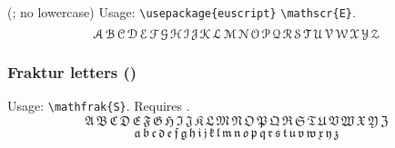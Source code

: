 \begingroup
\noindent
(; no lowercase) Usage: \verb'\usepackage{euscript}' \verb'\mathscr{E}'.
\renewcommand{\mathscr}{\EuScript}
\[
\mathscr{A}\,\mathscr{B}\,\mathscr{C}\,\mathscr{D}\,\mathscr{E}
\,\mathscr{F}\,\mathscr{G}\,\mathscr{H}\,\mathscr{I}\,\mathscr{J}
\,\mathscr{K}\,\mathscr{L}\,\mathscr{M}\,\mathscr{N}\,\mathscr{O}
\,\mathscr{P}\,\mathscr{Q}\,\mathscr{R}\,\mathscr{S}\,\mathscr{T}
\,\mathscr{U}\,\mathscr{V}\,\mathscr{W}\,\mathscr{X}\,\mathscr{Y}
\,\mathscr{Z}
\]
\endgroup

\subsubsection{Fraktur letters ()}
Usage: \verb'\mathfrak{S}'.  Requires .
\[
\mathfrak{A}\,\mathfrak{B}\,\mathfrak{C}\,\mathfrak{D}\,\mathfrak{E}
\,\mathfrak{F}\,\mathfrak{G}\,\mathfrak{H}\,\mathfrak{I}\,\mathfrak{J}
\,\mathfrak{K}\,\mathfrak{L}\,\mathfrak{M}\,\mathfrak{N}\,\mathfrak{O}
\,\mathfrak{P}\,\mathfrak{Q}\,\mathfrak{R}\,\mathfrak{S}\,\mathfrak{T}
\,\mathfrak{U}\,\mathfrak{V}\,\mathfrak{W}\,\mathfrak{X}\,\mathfrak{Y}
\,\mathfrak{Z}
\]
\[
\mathfrak{a}\,\mathfrak{b}\,\mathfrak{c}\,\mathfrak{d}\,\mathfrak{e}
\,\mathfrak{f}\,\mathfrak{g}\,\mathfrak{h}\,\mathfrak{i}\,\mathfrak{j}
\,\mathfrak{k}\,\mathfrak{l}\,\mathfrak{m}\,\mathfrak{n}\,\mathfrak{o}
\,\mathfrak{p}\,\mathfrak{q}\,\mathfrak{r}\,\mathfrak{s}\,\mathfrak{t}
\,\mathfrak{u}\,\mathfrak{v}\,\mathfrak{w}\,\mathfrak{x}\,\mathfrak{y}
\,\mathfrak{z}
\]


